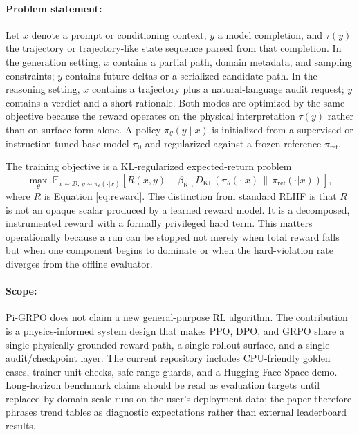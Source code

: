 \documentclass{article}
\begin{document}
\paragraph{Problem statement:}
Let $x$ denote a prompt or conditioning context, $y$ a model completion, and $\tau(y)$ the trajectory or trajectory-like state sequence parsed from that completion. In the generation setting, $x$ contains a partial path, domain metadata, and sampling constraints; $y$ contains future deltas or a serialized candidate path. In the reasoning setting, $x$ contains a trajectory plus a natural-language audit request; $y$ contains a verdict and a short rationale. Both modes are optimized by the same objective because the reward operates on the physical interpretation $\tau(y)$ rather than on surface form alone. A policy $\pi_\theta(y\mid x)$ is initialized from a supervised or instruction-tuned base model $\pi_0$ and regularized against a frozen reference $\pi_{\mathrm{ref}}$.

\smallskip
The training objective is a KL-regularized expected-return problem
\begin{equation}
  \max_{\theta}\;
  \mathbb{E}_{x\sim\mathcal{D},\, y\sim\pi_\theta(\cdot|x)}
  \left[R(x,y) - \beta_{\mathrm{KL}}\,
  D_{\mathrm{KL}}\!\left(\pi_\theta(\cdot|x)\,\|\,\pi_{\mathrm{ref}}(\cdot|x)\right)\right],
\label{eq:klobjective}
\end{equation}
where $R$ is Equation \ref{eq:reward}. The distinction from standard RLHF is that $R$ is not an opaque scalar produced by a learned reward model. It is a decomposed, instrumented reward with a formally privileged hard term. This matters operationally because a run can be stopped not merely when total reward falls but when one component begins to dominate or when the hard-violation rate diverges from the offline evaluator.

\paragraph{Scope:}
Pi-GRPO does not claim a new general-purpose RL algorithm. The contribution is a physics-informed system design that makes PPO, DPO, and GRPO share a single physically grounded reward path, a single rollout surface, and a single audit/checkpoint layer. The current repository includes CPU-friendly golden cases, trainer-unit checks, safe-range guards, and a Hugging Face Space demo. Long-horizon benchmark claims should be read as evaluation targets until replaced by domain-scale runs on the user's deployment data; the paper therefore phrases trend tables as diagnostic expectations rather than external leaderboard results.
\end{document}
